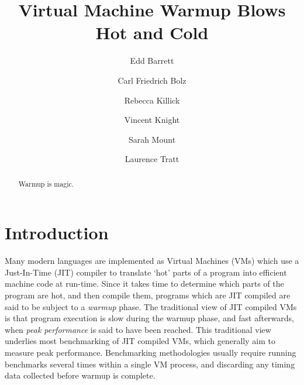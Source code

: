\documentclass[a4paper,UKenglish]{lipics}
\begin{document}
\title{Virtual Machine Warmup Blows Hot and Cold}
\author[1]{Edd Barrett}
\author[2]{Carl Friedrich Bolz}
\author[3]{Rebecca Killick}
\author[4]{Vincent Knight}
\author[5]{Sarah Mount}
\author[6]{Laurence Tratt}



\maketitle

\begin{abstract}
Warmup is magic.
\end{abstract}

\section{Introduction}
\label{sec:intro}

Many modern languages are implemented as Virtual Machines (VMs) which use a
Just-In-Time (JIT) compiler to translate `hot' parts of a program into efficient
machine code at run-time. Since it takes time to determine which parts of the
program are hot, and then compile them, programs which are JIT compiled are
said to be subject to a \emph{warmup} phase. The traditional view of
JIT compiled VMs is that program execution is slow during the warmup phase, and
fast afterwards, when \emph{peak performance} is said to have been reached.
This traditional view underlies most benchmarking of JIT compiled VMs, which
generally aim to measure peak performance. Benchmarking methodologies usually
require running benchmarks several times within a single VM process, and
discarding any timing data collected before warmup is complete.
\end{document}
